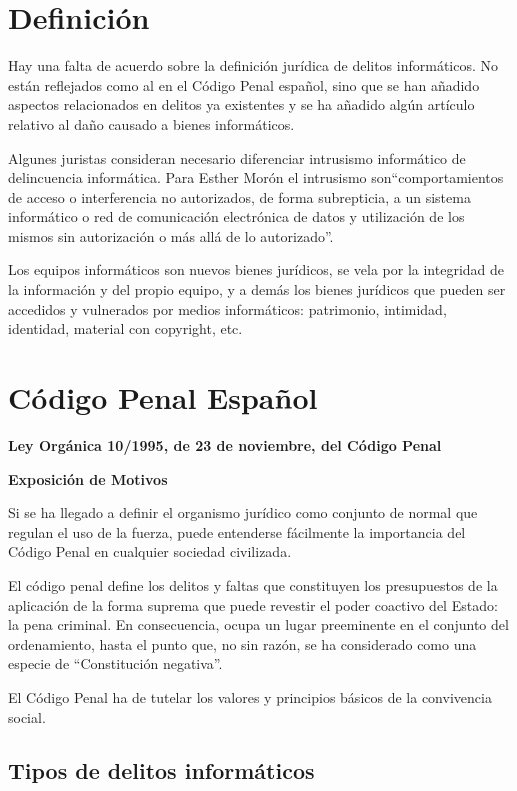 
\section{Definición}

Hay una falta de acuerdo sobre la definición jurídica de delitos informáticos. No están reflejados como al en el Código Penal español, sino que se han añadido aspectos relacionados en delitos ya existentes y se ha añadido algún artículo relativo al daño causado a bienes informáticos.

Algunes juristas consideran necesario diferenciar intrusismo informático de delincuencia informática.
Para Esther Morón el intrusismo son``comportamientos de acceso o interferencia no autorizados, de forma subrepticia, a un sistema informático o red de comunicación electrónica de datos y utilización de los mismos sin autorización o más allá de lo autorizado''.

Los equipos informáticos son nuevos bienes jurídicos, se vela por la integridad de la información y del propio equipo, y a demás los bienes jurídicos que pueden ser accedidos y vulnerados por medios informáticos: patrimonio, intimidad, identidad, material con copyright, etc.

\section{Código Penal Español}

\textbf{Ley Orgánica 10/1995, de 23 de noviembre, del Código Penal}

\textbf{Exposición de Motivos}

Si se ha llegado a definir el organismo jurídico como conjunto de normal que regulan el uso de la fuerza, puede entenderse fácilmente la importancia del Código Penal en cualquier sociedad civilizada.

El código penal define los delitos y faltas que constituyen los presupuestos de la aplicación de la forma suprema que puede revestir el poder coactivo del Estado: la pena criminal. En consecuencia, ocupa un lugar preeminente en el conjunto del ordenamiento, hasta el punto que, no sin razón, se ha considerado como una especie de ``Constitución negativa''.

El Código Penal ha de tutelar los valores y principios básicos de la convivencia social.

\subsection{Tipos de delitos informáticos}

